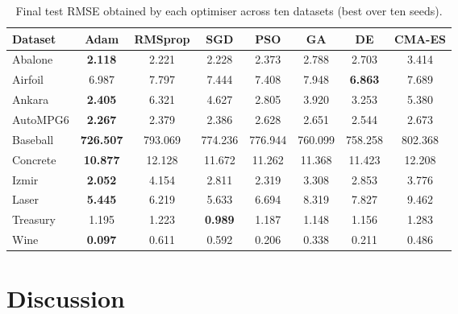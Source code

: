 \documentclass[conference]{IEEEtran}
\begin{document}
\begin{table}[t]
\centering
\caption{Final test RMSE obtained by each optimiser across ten datasets
(best over ten seeds).}
\label{tab:stage3_results}
\begin{adjustbox}{max width=\textwidth}
\begin{tabular}{lccccccc}
\toprule
Dataset & Adam & RMSprop & SGD & PSO & GA & DE & CMA-ES \\
\midrule
Abalone   
& \textbf{2.118} & 2.221 & 2.228 & 2.373 & 2.788 & 2.703 & 3.414 \\

Airfoil  
& 6.987 & 7.797 & 7.444 & 7.408 & 7.948 & \textbf{6.863} & 7.689 \\

Ankara   
& \textbf{2.405} & 6.321 & 4.627 & 2.805 & 3.920 & 3.253 & 5.380 \\

AutoMPG6 
& \textbf{2.267} & 2.379 & 2.386 & 2.628 & 2.651 & 2.544 & 2.673 \\

Baseball 
& \textbf{726.507} & 793.069 & 774.236 & 776.944 & 760.099 & 758.258 & 802.368 \\

Concrete 
& \textbf{10.877} & 12.128 & 11.672 & 11.262 & 11.368 & 11.423 & 12.208 \\

Izmir    
& \textbf{2.052} & 4.154 & 2.811 & 2.319 & 3.308 & 2.853 & 3.776 \\

Laser    
& \textbf{5.445} & 6.219 & 5.633 & 6.694 & 8.319 & 7.827 & 9.462 \\

Treasury 
& 1.195 & 1.223 & \textbf{0.989} & 1.187 & 1.148 & 1.156 & 1.283 \\

Wine     
& \textbf{0.097} & 0.611 & 0.592 & 0.206 & 0.338 & 0.211 & 0.486 \\
\bottomrule
\end{tabular}
\end{adjustbox}
\end{table}




\section{Discussion}
\end{document}
